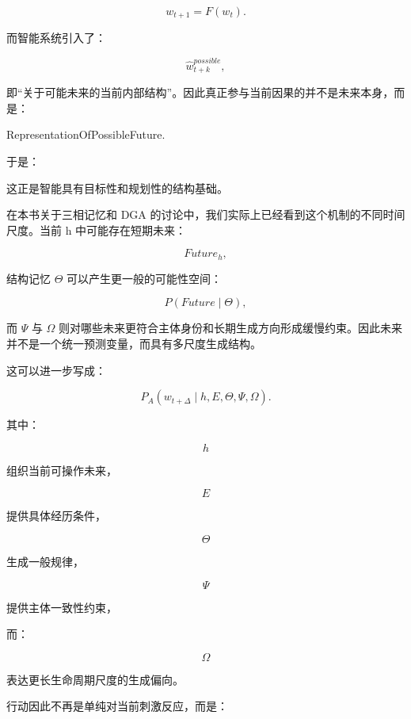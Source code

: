 \[
w_{t+1}
=
F(w_t).
\]

而智能系统引入了：

\[
\hat w_{t+k}^{possible},
\]

即“关于可能未来的当前内部结构”。因此真正参与当前因果的并不是未来本身，而是：

\begin{statementbox}
RepresentationOfPossibleFuture.
\end{statementbox}

于是：

\begin{statementbox}
\centering
{}
\end{statementbox}

这正是智能具有目标性和规划性的结构基础。

在本书关于三相记忆和 DGA 的讨论中，我们实际上已经看到这个机制的不同时间尺度。当前 h 中可能存在短期未来：

\[
Future_h,
\]

结构记忆 \(\Theta\) 可以产生更一般的可能性空间：

\[
P(
Future
\mid
\Theta
),
\]

而 \(\Psi\) 与 \(\Omega\) 则对哪些未来更符合主体身份和长期生成方向形成缓慢约束。因此未来并不是一个统一预测变量，而具有多尺度生成结构。

这可以进一步写成：

\[
P_A
\left(
w_{t+\Delta}
\mid
h,E,\Theta,\Psi,\Omega
\right).
\]

其中：

\[
h
\]

组织当前可操作未来，

\[
E
\]

提供具体经历条件，

\[
\Theta
\]

生成一般规律，

\[
\Psi
\]

提供主体一致性约束，

而：

\[
\Omega
\]

表达更长生命周期尺度的生成偏向。

行动因此不再是单纯对当前刺激反应，而是：

\begin{statementbox}
\centering
{}
\end{statementbox}

